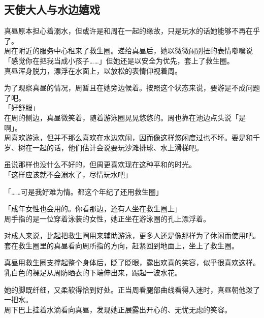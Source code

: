 \subsection{天使大人与水边嬉戏}

真昼原本担心着溺水，但或许是和周在一起的缘故，只是玩水的话她能够不再在乎了。\\

周在附近的服务中心租来了救生圈。递给真昼后，她以微微闹别扭的表情嘟囔说「感觉你在把我当成小孩子……」但她还是以安全为优先，套上了救生圈。\\%

真昼浑身脱力，漂浮在水面上，以放松的表情仰视着周。

为了观察真昼的情况，周暂且在她旁边候着。按照这个状态来说，要游是不成问题了吧。\\

「好舒服」\\

在周的侧边，真昼微笑着，随着游泳圈晃晃悠悠的。周也靠在池边点头说「是啊」。\\

周喜欢游泳，但并不那么喜欢在水边欢闹，因而像这样悠闲度过也不坏。要是和千岁、树在一起的话，他们估计会说要玩沙滩排球、水上滑梯吧。

虽说那样也没什么不好的，但周更喜欢现在这种平和的时光。\\

「这样应该就不会溺水了，尽情玩水吧」

「……可是我好难为情。都这个年纪了还用救生圈」

「成年女性也会用的。你看那边，还有人坐在救生圈上」\\

周手指的是一位穿着泳装的女性，她正坐在游泳圈的孔上漂浮着。

对成人来说，比起把救生圈用来辅助游泳，更多人还是像那样为了休闲而使用吧。\\

套在救生圈里的真昼看向周所指的方向，赶紧回到地面上，坐上了救生圈。

真昼用救生圈支撑起整个身体后，眨了眨眼，露出欢喜的笑容，似乎很喜欢这样。\\

乳白色的裸足从周防晒衣的下端伸出来，踢起一波水花。

她的脚既纤细，又柔软得恰到好处。正当周看腿部曲线看得入迷时，真昼朝他泼了一把水。\\

周下巴上挂着水滴看向真昼，发现她正展露出开心的、无忧无虑的笑容。\\

